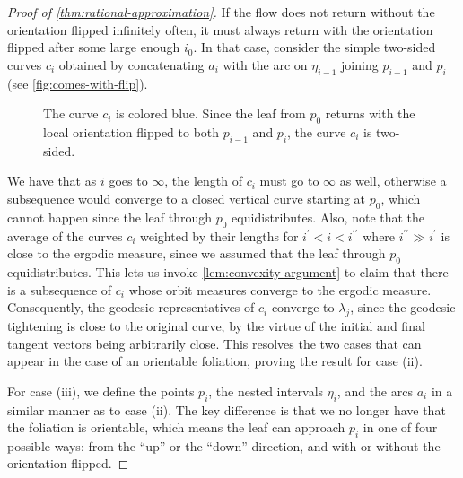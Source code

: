 \documentclass[12pt, reqno]{amsart}
\begin{document}
\begin{proof}[Proof of \autoref{thm:rational-approximation}]
  If the flow does not return without the orientation flipped infinitely often, it must always return with the orientation flipped after some large enough $i_0$.
  In that case, consider the simple two-sided curves $c_i$ obtained by concatenating $a_i$ with the arc on $\eta_{i-1}$ joining $p_{i-1}$ and $p_i$ (see \autoref{fig:comes-with-flip}).
  \begin{figure}[h]
    \centering
    \caption{The curve $c_i$ is colored blue. Since the leaf from $p_0$ returns with the local orientation flipped to both $p_{i-1}$ and $p_{i}$, the curve $c_i$ is two-sided.}
    \label{fig:comes-with-flip}
  \end{figure}
  We have that as $i$ goes to $\infty$, the length of $c_i$ must go to $\infty$ as well, otherwise a subsequence would converge to a closed vertical curve starting at $p_0$, which cannot happen since the leaf through $p_0$ equidistributes.
  Also, note that the average of the curves $c_i$ weighted by their lengths for $i^{\prime} < i < i^{\prime \prime}$ where $i^{\prime \prime} \gg i^{\prime}$ is close to the ergodic measure, since we assumed that the leaf through $p_0$ equidistributes.
  This lets us invoke \autoref{lem:convexity-argument} to claim that there is a subsequence of $c_i$ whose orbit measures converge to the ergodic measure.
  Consequently, the geodesic representatives of $c_i$ converge to $\lambda_j$, since the geodesic tightening is close to the original curve, by the virtue of the initial and final tangent vectors being arbitrarily close.
  This resolves the two cases that can appear in the case of an orientable foliation, proving the result for case (ii).

  For case (iii), we define the points $p_i$, the nested intervals $\eta_i$, and the arcs $a_i$ in a similar manner as to case (ii).
  The key difference is that we no longer have that the foliation is orientable, which means the leaf can approach $p_i$ in one of four possible ways: from the ``up'' or the ``down'' direction, and with or without the orientation flipped.


\end{proof}
\end{document}
